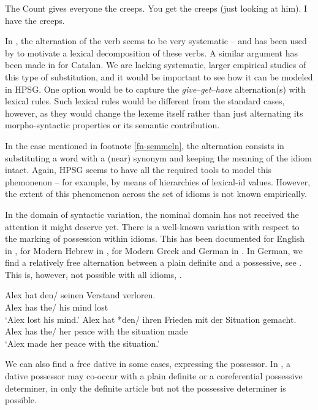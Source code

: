\documentclass[output=paper]{langsci/langscibook}
\begin{document}
\eal  \label{creeps}
\ex The Count gives everyone the creeps.
\ex You get the creeps (just looking at him).
\ex I have the creeps.
\zl 

In , the alternation of the verb seems to be very systematic -- and has been used by \cite{Richards:01} to motivate a lexical decomposition of these verbs.
A similar argument has been made in \cite{Mateu:Espinal:07} for Catalan. 
We are lacking systematic, larger empirical studies of this type of substitution, and it would be important to see how it can be modeled in HPSG. 
One option would be to capture the \emph{give}--\emph{get}--\emph{have} alternation(s) with lexical rules. Such lexical rules would be different from the standard cases, however, as they would change the lexeme itself rather than just alternating its morpho-syntactic properties or its semantic contribution.

In the case mentioned in footnote \ref{fn-semmeln}, the alternation consists in substituting a word with a (near) synonym and keeping the meaning of the idiom intact. Again, HPSG seems to have all the required tools to model this phemonenon -- for example, by means of hierarchies of lexical-id values. 
However, the extent of this phenomenon across the set of idioms is not known empirically. 

\medskip%
In the domain of syntactic variation, the nominal domain has not received the attention it might deserve yet. 
There is a well-known variation with respect to the marking of possession within idioms. 
This has been documented for English in \cite{Ho:15}, for Modern Hebrew in \cite{Almog:12}, for Modern Greek and German in \cite{Markantonatou:Sailer:16}. 
In German, we find a relatively free alternation between a plain definite and a possessive, see . This is, however, not possible with all idioms,  .

\eal \label{ex-verstand-herz}
\ex 
\gll Alex hat den/ seinen Verstand verloren.\\
Alex has the/ his mind lost\\
\glt `Alex lost his mind.'\label{ex-verstand}
\ex 
\gll Alex hat *den/ ihren Frieden mit der Situation gemacht.\\
Alex has the/ her peace with the situation made\\
\glt `Alex made her peace with the situation.'\label{ex-frieden}
\zl 


We can also find a free dative in some cases, expressing the possessor. 
In , a dative possessor may co-occur with a plain definite or a coreferential possessive determiner, in  only the definite article but not the possessive determiner is possible.  
\end{document}

